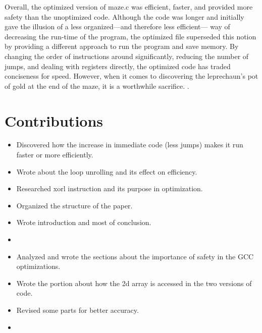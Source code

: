 \documentclass[12pt,letterpaper]{article}
\begin{document}
Overall, the optimized version of maze.c was efficient, faster, and provided 
more safety than the unoptimized code. Although the code was longer and 
initially gave the illusion of a less organized---and therefore less efficient---
way of decreasing the run-time of the program, the optimized file superseded 
this notion by providing a different approach to run the program and save memory.
By changing the order of instructions around significantly, reducing the number of 
jumps, and dealing with registers directly, the optimized code has traded conciseness 
for speed. However, when it comes to discovering the leprechaun's pot of gold at 
the end of the maze, it is a worthwhile sacrifice. 
\newpage
\appendix .
\appendixpage
\section{Contributions}
\begin{itemize}
\item Discovered how the increase in immediate code (less jumps) makes it
      run faster or more efficiently.
\item Wrote about the loop unrolling and its effect on efficiency.
\item Researched xorl instruction and its purpose in optimization.
\item Organized the structure of the paper.
\item Wrote introduction and most of conclusion.
\end{itemize}

\begin{itemize}
\item %
\end{itemize}

\begin{itemize}
\item Analyzed and wrote the sections about the importance of safety in the GCC
      optimizations.
\item Wrote the portion about how the 2d array is accessed in the two versions
      of code.
\item Revised some parts for better accuracy.
\end{itemize}

\begin{itemize}
\item %
\end{itemize}
\end{document}
